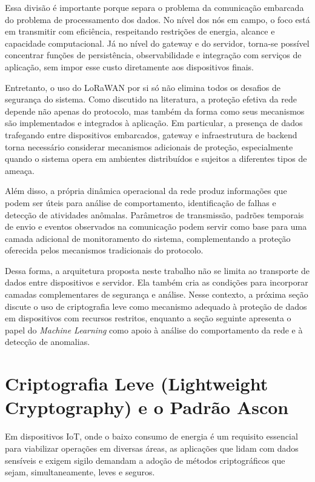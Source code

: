 Essa divisão é importante porque separa o problema da comunicação embarcada do problema de processamento dos dados. No nível dos nós em campo, o foco está em transmitir com eficiência, respeitando restrições de energia, alcance e capacidade computacional. Já no nível do gateway e do servidor, torna-se possível concentrar funções de persistência, observabilidade e integração com serviços de aplicação, sem impor esse custo diretamente aos dispositivos finais.

Entretanto, o uso do LoRaWAN por si só não elimina todos os desafios de segurança do sistema. Como discutido na literatura, a proteção efetiva da rede depende não apenas do protocolo, mas também da forma como seus mecanismos são implementados e integrados à aplicação. Em particular, a presença de dados trafegando entre dispositivos embarcados, gateway e infraestrutura de backend torna necessário considerar mecanismos adicionais de proteção, especialmente quando o sistema opera em ambientes distribuídos e sujeitos a diferentes tipos de ameaça.

Além disso, a própria dinâmica operacional da rede produz informações que podem ser úteis para análise de comportamento, identificação de falhas e detecção de atividades anômalas. Parâmetros de transmissão, padrões temporais de envio e eventos observados na comunicação podem servir como base para uma camada adicional de monitoramento do sistema, complementando a proteção oferecida pelos mecanismos tradicionais do protocolo.

Dessa forma, a arquitetura proposta neste trabalho não se limita ao transporte de dados entre dispositivos e servidor. Ela também cria as condições para incorporar camadas complementares de segurança e análise. Nesse contexto, a próxima seção discute o uso de criptografia leve como mecanismo adequado à proteção de dados em dispositivos com recursos restritos, enquanto a seção seguinte apresenta o papel do \textit{Machine Learning} como apoio à análise do comportamento da rede e à detecção de anomalias.



\section{Criptografia Leve (Lightweight Cryptography) e o Padrão Ascon}
Em dispositivos IoT, onde o baixo consumo de energia é um requisito essencial para viabilizar operações em diversas áreas, as aplicações que lidam com dados sensíveis e exigem sigilo demandam a adoção de métodos criptográficos que sejam, simultaneamente, leves e seguros.

